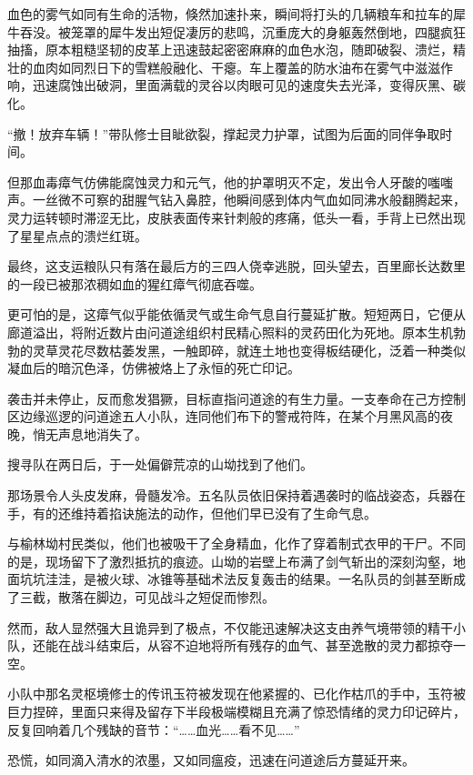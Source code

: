 血色的雾气如同有生命的活物，倏然加速扑来，瞬间将打头的几辆粮车和拉车的犀牛吞没。被笼罩的犀牛发出短促凄厉的悲鸣，沉重庞大的身躯轰然倒地，四腿疯狂抽搐，原本粗糙坚韧的皮革上迅速鼓起密密麻麻的血色水泡，随即破裂、溃烂，精壮的血肉如同烈日下的雪糕般融化、干瘪。车上覆盖的防水油布在雾气中滋滋作响，迅速腐蚀出破洞，里面满载的灵谷以肉眼可见的速度失去光泽，变得灰黑、碳化。

“撤！放弃车辆！”带队修士目眦欲裂，撑起灵力护罩，试图为后面的同伴争取时间。

但那血毒瘴气仿佛能腐蚀灵力和元气，他的护罩明灭不定，发出令人牙酸的嗤嗤声。一丝微不可察的甜腥气钻入鼻腔，他瞬间感到体内气血如同沸水般翻腾起来，灵力运转顿时滞涩无比，皮肤表面传来针刺般的疼痛，低头一看，手背上已然出现了星星点点的溃烂红斑。

最终，这支运粮队只有落在最后方的三四人侥幸逃脱，回头望去，百里廊长达数里的一段已被那浓稠如血的猩红瘴气彻底吞噬。

更可怕的是，这瘴气似乎能依循灵气或生命气息自行蔓延扩散。短短两日，它便从廊道溢出，将附近数片由问道途组织村民精心照料的灵药田化为死地。原本生机勃勃的灵草灵花尽数枯萎发黑，一触即碎，就连土地也变得板结硬化，泛着一种类似凝血后的暗沉色泽，仿佛被烙上了永恒的死亡印记。

袭击并未停止，反而愈发猖獗，目标直指问道途的有生力量。一支奉命在己方控制区边缘巡逻的问道途五人小队，连同他们布下的警戒符阵，在某个月黑风高的夜晚，悄无声息地消失了。

搜寻队在两日后，于一处偏僻荒凉的山坳找到了他们。

那场景令人头皮发麻，骨髓发冷。五名队员依旧保持着遇袭时的临战姿态，兵器在手，有的还维持着掐诀施法的动作，但他们早已没有了生命气息。

与榆林坳村民类似，他们也被吸干了全身精血，化作了穿着制式衣甲的干尸。不同的是，现场留下了激烈抵抗的痕迹。山坳的岩壁上布满了剑气斩出的深刻沟壑，地面坑坑洼洼，是被火球、冰锥等基础术法反复轰击的结果。一名队员的剑甚至断成了三截，散落在脚边，可见战斗之短促而惨烈。

然而，敌人显然强大且诡异到了极点，不仅能迅速解决这支由养气境带领的精干小队，还能在战斗结束后，从容不迫地将所有残存的血气、甚至逸散的灵力都掠夺一空。

小队中那名灵枢境修士的传讯玉符被发现在他紧握的、已化作枯爪的手中，玉符被巨力捏碎，里面只来得及留存下半段极端模糊且充满了惊恐情绪的灵力印记碎片，反复回响着几个残缺的音节：“……血光……看不见……”

\vspace{2em}

恐慌，如同滴入清水的浓墨，又如同瘟疫，迅速在问道途后方蔓延开来。

